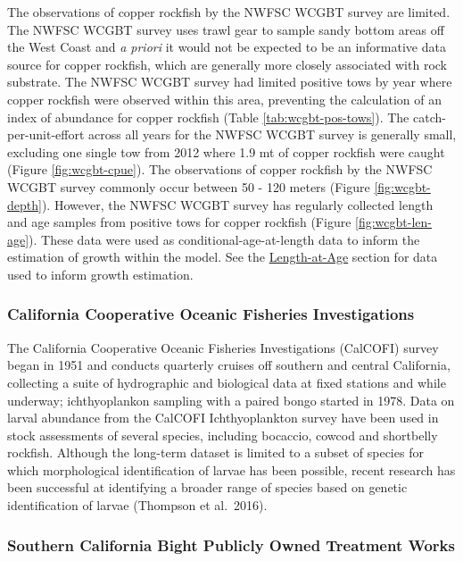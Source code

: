 \documentclass[11pt,
  english,
  letterpaper,
]{article}
\begin{document}
The observations of copper rockfish by the NWFSC WCGBT survey are limited. The NWFSC WCGBT survey uses trawl gear to sample sandy bottom areas off the West Coast and \emph{a priori} it would not be expected to be an informative data source for copper rockfish, which are generally more closely associated with rock substrate. The NWFSC WCGBT survey had limited positive tows by year where copper rockfish were observed within this area, preventing the calculation of an index of abundance for copper rockfish (Table \ref{tab:wcgbt-pos-tows}). The catch-per-unit-effort across all years for the NWFSC WCGBT survey is generally small, excluding one single tow from 2012 where 1.9 mt of copper rockfish were caught (Figure \ref{fig:wcgbt-cpue}). The observations of copper rockfish by the NWFSC WCGBT survey commonly occur between 50 - 120 meters (Figure \ref{fig:wcgbt-depth}). However, the NWFSC WCGBT survey has regularly collected length and age samples from positive tows for copper rockfish (Figure \ref{fig:wcgbt-len-age}). These data were used as conditional-age-at-length data to inform the estimation of growth within the model. See the \protect\hyperlink{length-at-age}{Length-at-Age} section for data used to inform growth estimation.

\hypertarget{california-cooperative-oceanic-fisheries-investigations}{%
\subsubsection{California Cooperative Oceanic Fisheries Investigations}\label{california-cooperative-oceanic-fisheries-investigations}}

The California Cooperative Oceanic Fisheries Investigations (CalCOFI) survey began in 1951 and conducts quarterly cruises off southern and central California, collecting a suite of hydrographic and biological data at fixed stations and while underway; ichthyoplankon sampling with a paired bongo started in 1978. Data on larval abundance from the CalCOFI Ichthyoplankton survey have been used in stock assessments of several species, including bocaccio, cowcod and shortbelly rockfish. Although the long-term dataset is limited to a subset of species for which morphological identification of larvae has been possible, recent research has been successful at identifying a broader range of species based on genetic identification of larvae (Thompson et al.~2016).

\hypertarget{southern-california-bight-publicly-owned-treatment-works}{%
\subsubsection{Southern California Bight Publicly Owned Treatment Works}\label{southern-california-bight-publicly-owned-treatment-works}}
\end{document}
